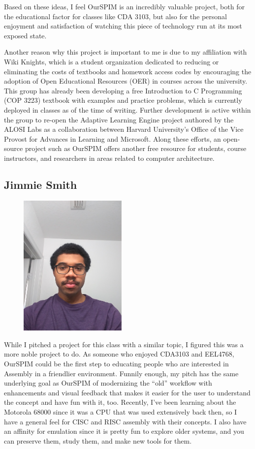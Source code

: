\documentclass[parskip=half, fontsize=12pt]{scrartcl}
\begin{document}
Based on these ideas, I feel OurSPIM is an incredibly valuable project, both for the educational factor for classes like CDA 3103, but also for the personal enjoyment and satisfaction of watching this piece of technology run at its most exposed state.

Another reason why this project is important to me is due to my affiliation with Wiki Knights, which is a student organization dedicated to reducing or eliminating the costs of textbooks and homework access codes by encouraging the adoption of Open Educational Resources (OER) in courses across the university. This group has already been developing a free Introduction to C Programming (COP 3223) textbook with examples and practice problems, which is currently deployed in classes as of the time of writing. Further development is active within the group to re-open the Adaptive Learning Engine project authored by the ALOSI Labs as a collaboration between Harvard University's Office of the Vice Provost for Advances in Learning and Microsoft. Along these efforts, an open-source project such as OurSPIM offers another free resource for students, course instructors, and researchers in areas related to computer architecture.


\subsection{Jimmie Smith}
\begin{figure}[H]
    \centering
    \includegraphics[height=7cm]{profile-jimmie}
\end{figure}

While I pitched a project for this class with a similar topic, I figured this was a more noble project to do. As someone who enjoyed CDA3103 and EEL4768, OurSPIM could be the first step to educating people who are interested in Assembly in a friendlier environment. Funnily enough, my pitch has the same underlying goal as OurSPIM of modernizing the ``old'' workflow with enhancements and visual feedback that makes it easier for the user to understand the concept and have fun with it, too. Recently, I've been learning about the Motorola 68000 since it was a CPU that was used extensively back then, so I have a general feel for CISC and RISC assembly with their concepts. I also have an affinity for emulation since it is pretty fun to explore older systems, and you can preserve them, study them, and make new tools for them.
\end{document}
